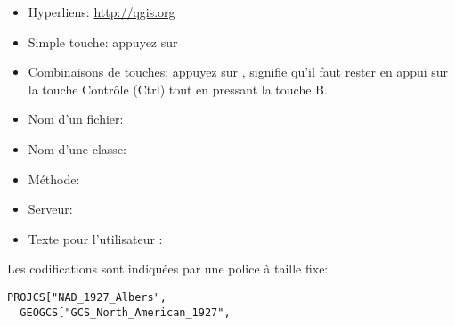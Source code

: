 \begin{itemize}
%
\item Hyperliens: \url{http://qgis.org}
\item Simple touche: appuyez sur 
\item Combinaisons de touches: appuyez sur , signifie qu'il faut rester en appui sur la touche Contrôle (Ctrl) tout en pressant la touche B.
\item Nom d'un fichier: 
\item Nom d'une classe: 
\item Méthode: 
\item Serveur: 
%
\item Texte pour l'utilisateur : 
\end{itemize}

Les codifications sont indiquées par une police à taille fixe:
\begin{verbatim}
PROJCS["NAD_1927_Albers",
  GEOGCS["GCS_North_American_1927",
\end{verbatim}

% 

